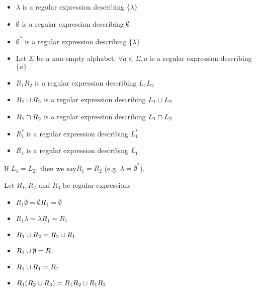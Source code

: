 \documentclass{article}
\newcommand{\emptyString}{\lambda}
\begin{document}
\begin{itemize}
    \item \(\emptyString\) is a regular expression describing  \(\{\emptyString\}\)
    \item \(\emptyset\) is a regular expression describing \(\emptyset\)
    \item \(\emptyset^*\) is a regular expression describing \(\{\emptyString\}\)
    \item Let \(\Sigma\) be a non-empty alphabet, \(\forall a \in \Sigma, a\) is a regular expression describing \(\{a\}\)
    \item \(R_1R_2\) is a regular expression describing \(L_1L_2\)
    \item \(R_1\cup R_2\) is a regular expression describing \(L_1\cup L_2\)
    \item \(R_1\cap R_2\) is a regular expression describing \(L_1\cap L_2\)
    \item \(R_1^*\) is a regular expression describing \(L_1^*\)
    \item \(\bar{R_1}\) is a regular expression describing \(\bar{L_1}\)
\end{itemize}
If \(L_1 = L_2\), then we say\(R_1 = R_2\) (e.g. \(\emptyString = \emptyset^*\)).

Let \(R_1, R_2\) and \(R_3\) be regular expressions
\begin{itemize}
    \item \(R_1 \emptyset = \emptyset R_1 = \emptyset\)
    \item \(R_1 \emptyString = \emptyString R_1 = R_1\)
    \item \(R_1 \cup R_2 = R_2 \cup R_1\)
    \item \(R_1 \cup \emptyset = R_1\)
    \item \(R_1 \cup R_1 = R_1\)
    \item \(R_1(R_2 \cup R_3) = R_1R_2 \cup R_1R_3\)
\end{itemize}
\end{document}
